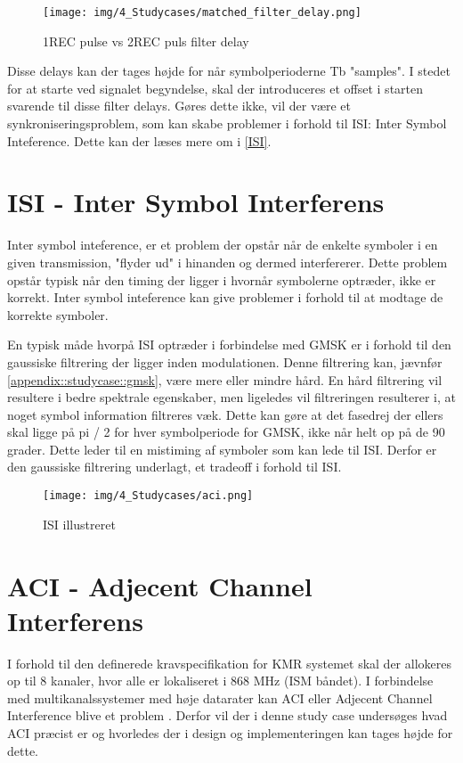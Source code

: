 \begin{appendices}
\begin{figure}[H]
	\centering{}
	\texttt{[image: img/4\_Studycases/matched\_filter\_delay.png]}
	\caption{1REC pulse vs 2REC puls filter delay}
	\label{fig:1rec_2rec_delay}
\end{figure} 

Disse delays kan der tages højde for når symbolperioderne Tb "samples". I stedet for at starte ved signalet begyndelse, skal der introduceres et offset i starten svarende til disse filter delays. Gøres dette ikke, vil der være et synkroniseringsproblem, som kan skabe problemer i forhold til ISI: Inter Symbol Inteference. Dette kan der læses mere om i \ref{ISI}.

\pagebreak
\section{ISI - Inter Symbol Interferens} \label{appendix::studycase::isi}
Inter symbol inteference, er et problem der opstår når de enkelte symboler i en given transmission, "flyder ud" i hinanden og dermed interfererer. Dette problem opstår typisk når den timing der ligger i hvornår symbolerne optræder, ikke er korrekt. Inter symbol inteference kan give problemer i forhold til at modtage de korrekte symboler. 

En typisk måde hvorpå ISI optræder i forbindelse med GMSK er i forhold til den gaussiske filtrering der ligger inden modulationen. Denne filtrering kan, jævnfør \ref{appendix::studycase::gmsk}, være mere eller mindre hård. En hård filtrering vil resultere i bedre spektrale egenskaber, men ligeledes vil filtreringen resulterer i, at noget symbol information filtreres væk. Dette kan gøre at det fasedrej der ellers skal ligge på pi / 2 for hver symbolperiode for GMSK, ikke når helt op på de 90 grader. Dette leder til en mistiming af symboler som kan lede til ISI. Derfor er den gaussiske filtrering underlagt, et tradeoff i forhold til ISI.  

\begin{figure}[H]
	\centering{}
	\texttt{[image: img/4\_Studycases/aci.png]}
	\caption{ISI illustreret}
	\label{fig:ISI}
\end{figure} 

\pagebreak
\section{ACI - Adjecent Channel Interferens} \label{appendix::studycase::aci}
I forhold til den definerede kravspecifikation for KMR systemet skal der allokeres op til 8 kanaler, hvor alle er lokaliseret i 868 MHz (ISM båndet). I forbindelse med multikanalssystemer med høje datarater kan ACI eller Adjecent Channel Interference blive et problem \cite{ACI}. Derfor vil der i denne study case undersøges hvad ACI præcist er og hvorledes der i design og implementeringen kan tages højde for dette. 


\end{appendices}
